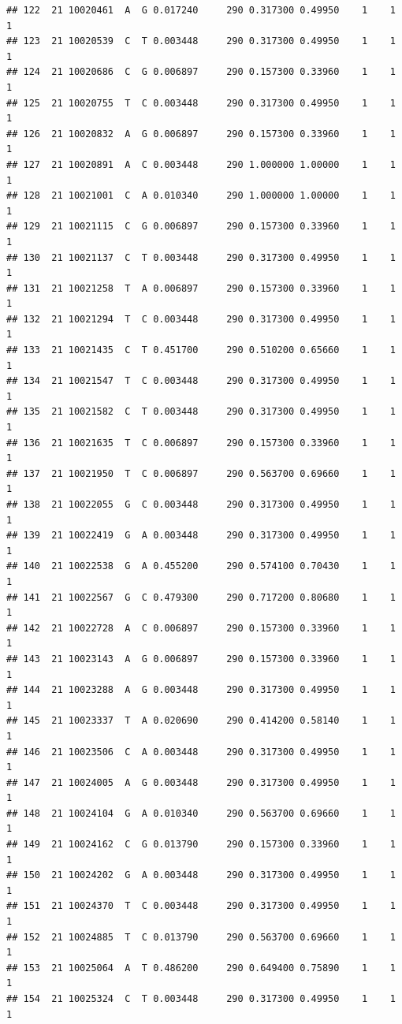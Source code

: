 \documentclass[
]{article}
\begin{document}
\begin{verbatim}
## 122  21 10020461  A  G 0.017240     290 0.317300 0.49950    1    1        1
## 123  21 10020539  C  T 0.003448     290 0.317300 0.49950    1    1        1
## 124  21 10020686  C  G 0.006897     290 0.157300 0.33960    1    1        1
## 125  21 10020755  T  C 0.003448     290 0.317300 0.49950    1    1        1
## 126  21 10020832  A  G 0.006897     290 0.157300 0.33960    1    1        1
## 127  21 10020891  A  C 0.003448     290 1.000000 1.00000    1    1        1
## 128  21 10021001  C  A 0.010340     290 1.000000 1.00000    1    1        1
## 129  21 10021115  C  G 0.006897     290 0.157300 0.33960    1    1        1
## 130  21 10021137  C  T 0.003448     290 0.317300 0.49950    1    1        1
## 131  21 10021258  T  A 0.006897     290 0.157300 0.33960    1    1        1
## 132  21 10021294  T  C 0.003448     290 0.317300 0.49950    1    1        1
## 133  21 10021435  C  T 0.451700     290 0.510200 0.65660    1    1        1
## 134  21 10021547  T  C 0.003448     290 0.317300 0.49950    1    1        1
## 135  21 10021582  C  T 0.003448     290 0.317300 0.49950    1    1        1
## 136  21 10021635  T  C 0.006897     290 0.157300 0.33960    1    1        1
## 137  21 10021950  T  C 0.006897     290 0.563700 0.69660    1    1        1
## 138  21 10022055  G  C 0.003448     290 0.317300 0.49950    1    1        1
## 139  21 10022419  G  A 0.003448     290 0.317300 0.49950    1    1        1
## 140  21 10022538  G  A 0.455200     290 0.574100 0.70430    1    1        1
## 141  21 10022567  G  C 0.479300     290 0.717200 0.80680    1    1        1
## 142  21 10022728  A  C 0.006897     290 0.157300 0.33960    1    1        1
## 143  21 10023143  A  G 0.006897     290 0.157300 0.33960    1    1        1
## 144  21 10023288  A  G 0.003448     290 0.317300 0.49950    1    1        1
## 145  21 10023337  T  A 0.020690     290 0.414200 0.58140    1    1        1
## 146  21 10023506  C  A 0.003448     290 0.317300 0.49950    1    1        1
## 147  21 10024005  A  G 0.003448     290 0.317300 0.49950    1    1        1
## 148  21 10024104  G  A 0.010340     290 0.563700 0.69660    1    1        1
## 149  21 10024162  C  G 0.013790     290 0.157300 0.33960    1    1        1
## 150  21 10024202  G  A 0.003448     290 0.317300 0.49950    1    1        1
## 151  21 10024370  T  C 0.003448     290 0.317300 0.49950    1    1        1
## 152  21 10024885  T  C 0.013790     290 0.563700 0.69660    1    1        1
## 153  21 10025064  A  T 0.486200     290 0.649400 0.75890    1    1        1
## 154  21 10025324  C  T 0.003448     290 0.317300 0.49950    1    1        1

\end{verbatim}
\end{document}
